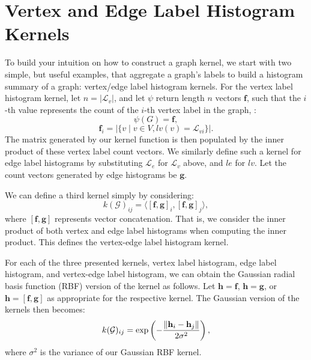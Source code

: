 \section{Vertex and Edge Label Histogram Kernels}
\label{appendix:graph_kernels:histogram}

To build your intuition on how to construct a graph kernel, we start with two
simple, but useful examples, that aggregate a graph's labels to build a
histogram summary of a graph: vertex/edge label histogram kernels. For the
vertex label histogram kernel, let $n=|\mathcal{L}_v|$, and let $\psi$ return
length $n$ vectors $\mathbf{f}$, such that the $i$-th value represents the count
of the $i$-th vertex label in the graph, \ie: 
\begin{equation}
    \psi(G) = \mathbf{f},
\end{equation}
\begin{equation}
    \mathbf{f}_i=|\{v \mid v \in V, lv(v) = \mathcal{L}_{vi}\}|.
\end{equation}
%
The matrix generated by our kernel function is then populated by the inner
product of these vertex label count vectors.
We similarly define such a kernel for edge label histograms by substituting
$\mathcal{L}_e$ for $\mathcal{L}_v$ above, and $le$ for $lv$. Let the count
vectors generated by edge histograms be $\mathbf{g}$.

We can define a third kernel simply by considering:
\begin{equation}
    k(\mathcal{G})_{ij} = \langle[\mathbf{f},\mathbf{g}]_i, [\mathbf{f},\mathbf{g}]_j\rangle,
\end{equation}
%
where $[\mathbf{f},\mathbf{g}]$ represents vector concatenation. That is, we
consider the inner product of both vertex and edge label histograms when
computing the inner product. This defines the vertex-edge label histogram
kernel.

For each of the three presented kernels, vertex label histogram, edge label
histogram, and vertex-edge label histogram, we can obtain the Gaussian radial
basis function (RBF) version of the kernel as follows. Let $\mathbf{h} =
\mathbf{f}$, $\mathbf{h} = \mathbf{g}$, or $\mathbf{h} = \mathbf{[\mathbf{f},
\mathbf{g}]}$ as appropriate for the respective kernel. The Gaussian version of
the kernels then becomes:
\begin{equation}
    k(\mathcal{G})_{ij} = \text{exp}\left(-\frac{\lVert\mathbf{h}_i - \mathbf{h}_j\rVert}{2\sigma^2}\right),
\end{equation}
%
where $\sigma^2$ is the variance of our Gaussian RBF kernel.

